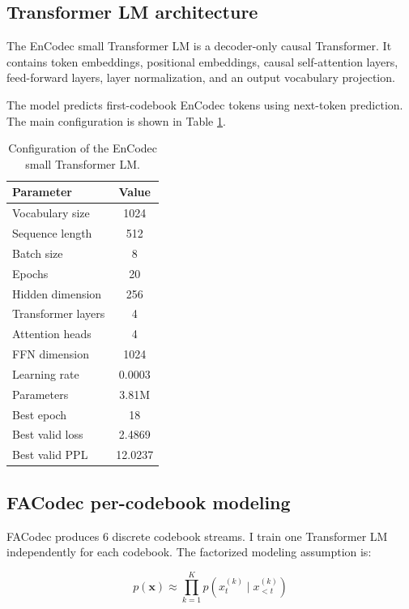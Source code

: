 \documentclass{article}
\begin{document}
	\subsection{Transformer LM architecture}
	
	The EnCodec small Transformer LM is a decoder-only causal Transformer. It contains token embeddings, positional embeddings, causal self-attention layers, feed-forward layers, layer normalization, and an output vocabulary projection.
	
	The model predicts first-codebook EnCodec tokens using next-token prediction. The main configuration is shown in Table \ref{tab:encodec_config}.
	
	\begin{table}[t]
		\centering
		\caption{Configuration of the EnCodec small Transformer LM.}
		\label{tab:encodec_config}
		\small
		\begin{tabular}{lc}
			\toprule
			\textbf{Parameter} & \textbf{Value} \\
			\midrule
			Vocabulary size & 1024 \\
			Sequence length & 512 \\
			Batch size & 8 \\
			Epochs & 20 \\
			Hidden dimension & 256 \\
			Transformer layers & 4 \\
			Attention heads & 4 \\
			FFN dimension & 1024 \\
			Learning rate & 0.0003 \\
			Parameters & 3.81M \\
			Best epoch & 18 \\
			Best valid loss & 2.4869 \\
			Best valid PPL & 12.0237 \\
			\bottomrule
		\end{tabular}
	\end{table}
	
	\subsection{FACodec per-codebook modeling}
	
	FACodec produces 6 discrete codebook streams. I train one Transformer LM independently for each codebook. The factorized modeling assumption is:
	
	$$
	p(\mathbf{x}) \approx \prod_{k=1}^{K} p(x_t^{(k)} \mid x_{<t}^{(k)})
	$$
	
\end{document}
